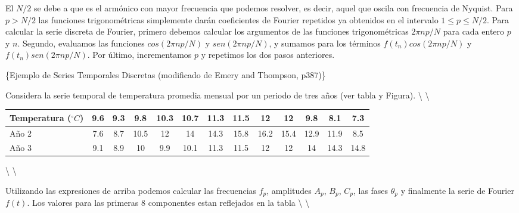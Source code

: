 \documentclass[
]{agujournal2019}
\begin{document}
El \(N/2\) se debe a que es el armónico con mayor frecuencia que podemos
resolver, es decir, aquel que oscila con frecuencia de Nyquist. Para
\(p>N/2\) las funciones trigonométricas simplemente darán coeficientes
de Fourier repetidos ya obtenidos en el intervalo \(1\le p\le N/2\).
Para calcular la serie discreta de Fourier, primero debemos calcular los
argumentos de las funciones trigonométricas \(2\pi n p / N\) para cada
entero \(p\) y \(n\). Segundo, evaluamos las funciones
\(cos(2\pi n p / N)\) y \(sen(2\pi n p / N)\), y sumamos para los
términos \(f(t_n)cos(2\pi n p / N)\) y \(f(t_n)sen(2\pi n p / N)\). Por
último, incrementamos \(p\) y repetimos los dos pasos anteriores.

\vspace{0.5cm}

\{\textbf \noindent Ejemplo de Series Temporales Discretas (modificado
de Emery and Thompson, p387)\}

Considera la serie temporal de temperatura promedia mensual por un
periodo de tres años (ver tabla y Figura). \textbackslash{}
\textbackslash{}

\begin{tabular}{|l|cccccccccccc|}

\hline
Temperatura ($^\circ C$) & 9.6 & 9.3 & 9.8 & 10.3 & 10.7 & 11.3 & 11.5 & 12 & 12 & 9.8 & 8.1 & 7.3\\
\hline
Año 2 & 7.6 & 8.7 & 10.5 & 12 & 14 & 14.3 & 15.8 & 16.2 & 15.4 & 12.9 & 11.9 & 8.5\\
\hline
Año 3 & 9.1 & 8.9 & 10 & 9.9 & 10.1 & 11.3 & 11.5 & 12 & 12 & 14 &14.3 & 14.8\\
\hline
\end{tabular}

\textbackslash{} \textbackslash{}

Utilizando las expresiones de arriba podemos calcular las frecuencias
\(f_p\), amplitudes \(A_p\), \(B_p\), \(C_p\), las fases \(\theta_p\) y
finalmente la serie de Fourier \(f(t)\). Los valores para las primeras 8
componentes estan reflejados en la tabla \textbackslash{}
\textbackslash{}
\end{document}
